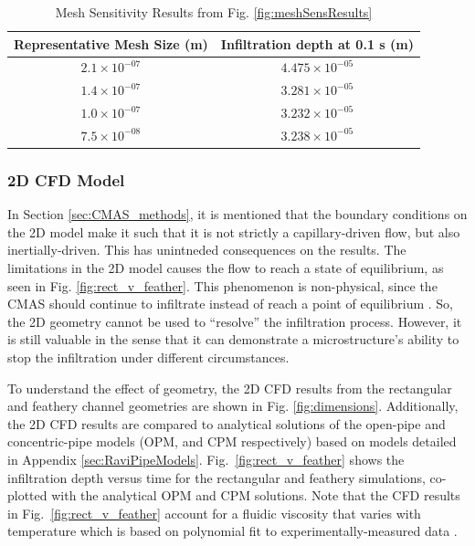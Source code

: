 \documentclass{UCF_ETD}
\begin{document}
\begin{table}[htp!]
    \centering
    \caption{Mesh Sensitivity Results from Fig. \ref{fig:meshSensResults}}
    \begin{tabular}{c|c}
       Representative Mesh Size (m)  & Infiltration depth at 0.1 s (m) \\
       \hline
        $2.1\times10^{-07}$ & $4.475\times10^{-05}$ \\
        $1.4\times10^{-07}$ & $3.281\times10^{-05}$ \\
        $1.0\times10^{-07}$ & $3.232\times10^{-05}$ \\
        $7.5\times10^{-08}$ & $3.238\times10^{-05}$
    \end{tabular}
    \label{tab:meshSensResults}
\end{table}

\subsubsection{2D CFD Model}
In Section \ref{sec:CMAS_methods}, it is mentioned that the boundary conditions on the 2D model make it such that it is not strictly a capillary-driven flow, but also inertially-driven. This has unintneded consequences on the results. The limitations in the 2D model causes the flow to reach a state of equilibrium, as seen in Fig. \ref{fig:rect_v_feather}. This phenomenon is non-physical, since the CMAS should continue to infiltrate instead of reach a point of equilibrium \cite{Naraparaju2017}. So, the 2D geometry cannot be used to ``resolve'' the infiltration process. However, it is still valuable in the sense that it can demonstrate a microstructure's ability to stop the infiltration under different circumstances.

To understand the effect of geometry, the 2D CFD results from the rectangular and feathery channel geometries are shown in Fig. \ref{fig:dimensions}.
Additionally, the 2D CFD results are compared to analytical solutions of the open-pipe and concentric-pipe models (OPM, and CPM respectively) \cite{Naraparaju2019} based on models detailed in Appendix \ref{sec:RaviPipeModels}. 
Fig.~\ref{fig:rect_v_feather} shows the infiltration depth versus time for the rectangular and feathery simulations, co-plotted with the analytical OPM and CPM solutions. 
Note that the CFD results in Fig.~\ref{fig:rect_v_feather} account for a fluidic viscosity that varies with temperature which is based on polynomial fit to experimentally-measured data \cite{Naraparaju2017}.\\
\end{document}
